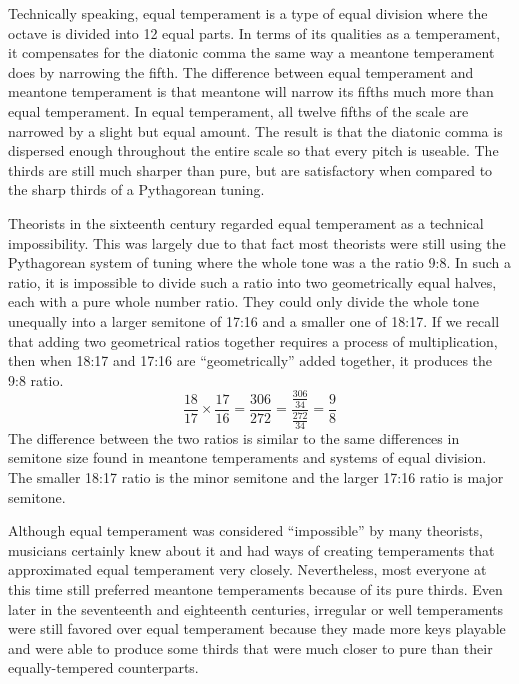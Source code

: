 Technically speaking, equal temperament is a type of equal division where the octave is
divided into 12 equal parts.  In terms of its qualities as a temperament, it compensates
for the diatonic comma the same way a meantone temperament does by narrowing the fifth.
The difference between equal temperament and meantone temperament is that meantone will
narrow its fifths much more than equal temperament.  In equal temperament, all twelve
fifths of the scale are narrowed by a slight but equal amount.  The result is that the
diatonic comma is dispersed enough throughout the entire scale so that every pitch is
useable.  The thirds are still much sharper than pure, but are satisfactory when compared
to the sharp thirds of a Pythagorean tuning.

Theorists in the sixteenth century regarded equal temperament as a technical
impossibility. This was largely due to that fact most theorists were still using the
Pythagorean system of tuning where the whole tone was a the ratio 9:8.  In such a ratio,
it is impossible to divide such a ratio into two geometrically equal halves, each with a
pure whole number ratio. They could only divide the whole tone unequally into a larger
semitone of 17:16 and a smaller one of 18:17. \autocite[20]{ML:1}  If we recall that
adding two geometrical ratios together requires a process of multiplication, then when
18:17 and 17:16 are ``geometrically'' added together, it produces the 9:8 ratio.
\begin{equation}
  \frac{18}{17} \times
  \frac{17}{16} =
  \frac{306}{272} =
  \frac{\frac{306}{34}}{\frac{272}{34}} =
  \frac{9}{8}
\end{equation}
The difference between the two ratios is similar to the same differences in semitone size
found in meantone temperaments and systems of equal division.  The smaller 18:17 ratio is
the minor semitone and the larger 17:16 ratio is major semitone.

Although equal temperament was considered ``impossible'' by many theorists, musicians
certainly knew about it and had ways of creating temperaments that approximated equal
temperament very closely.  Nevertheless, most everyone at this time still preferred
meantone temperaments because of its pure thirds. Even later in the seventeenth and
eighteenth centuries, irregular or well temperaments were still favored over equal
temperament because they made more keys playable and were able to produce some thirds that
were much closer to pure than their equally-tempered counterparts.

